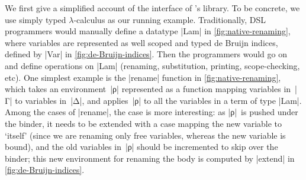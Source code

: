 \documentclass[sigplan,review,fleqn]{acmart}
\renewcommand{\verb}{\collectverb{\color{AgdaFunction}}}
\newcommand{\name}{\collectverb{\it}}
\begin{document}
We first give a simplified account of the interface of \citeauthor{Allais-generic-syntax}'s library.
To be concrete, we use simply typed $\lambda$-calculus as our running example.
Traditionally, DSL programmers would manually define a datatype \verb|Lam| in \cref{fig:native-renaming}, where variables are represented as well scoped and typed de Bruijn indices, defined by \verb|Var| in \cref{fig:de-Bruijn-indices}.
Then the programmers would go on and define operations on \verb|Lam| (renaming, substitution, printing, scope-checking, etc).
One simplest example is the \verb|rename| function in \cref{fig:native-renaming}, which takes an environment~\name|ρ| represented as a function mapping variables in~\name|Γ|\/ to variables in~\name|Δ|, and applies~\name|ρ| to all the variables in a term of type \verb|Lam|.
Among the cases of \verb|rename|, the  case is more interesting: as \name|ρ|~is pushed under the binder, it needs to be extended with a case mapping the new variable  to `itself' (since we are renaming only free variables, whereas the new variable is bound), and the old variables in~\name|ρ| should be incremented to skip over the binder; this new environment for renaming the body is computed by \verb|extend| in \cref{fig:de-Bruijn-indices}.
\end{document}
